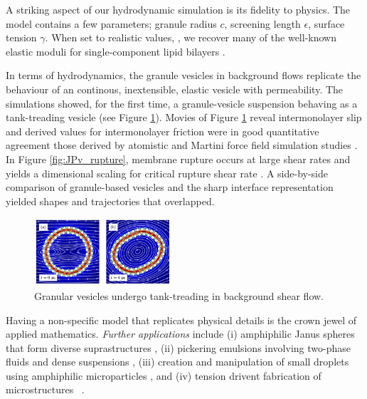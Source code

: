 A striking aspect of our hydrodynamic
simulation is its fidelity to physics.
The model contains a few
parameters; granule radius $c$,
screening length $\epsilon$,
surface tension $\gamma$.
When set to realistic values,
\cite{Fu2018_SIAM, ErLjCl89, Lin2005, Parsegian, Israelachvili80, GarciaSaez, KUZMIN2005, Petelska2012,Jackson2016},
we recover many of the well-known
elastic moduli for single-component lipid bilayers
\cite{Nagle17, Nagle17-2, LeVeWa14,NAGLE2000159}.

In terms of hydrodynamics, the granule vesicles in
background flows replicate
the behaviour of an continous, inextensible,
elastic vesicle with permeability.
The simulations showed, for the first time,
a granule-vesicle suspension behaving
as a tank-treading vesicle \cite{Finken2008, Shaqfeh11}
(see Figure \ref{fig:JPv_linearshear}).
Movies of Figure \ref{fig:JPv_linearshear} reveal
intermonolayer slip and derived values for intermonolayer
friction were in good quantitative agreement 
those derived by atomistic and Martini force field
simulation studies \cite{WuoEd06, denOtter2007, SHKULIPA2005823, Zgorski2019}.
In Figure \ref{fig:JPv_rupture},
membrane rupture occurs at large shear rates 
and yields a dimensional scaling for 
critical rupture shear rate 
\cite{VLAHOVSKA2009775,keller_skalak_1982}.
A side-by-side comparison
of granule-based vesicles and the sharp interface
representation yielded shapes and trajectories that
overlapped.

\begin{figure}
\includegraphics[width=0.46\textwidth]{figures/PreliminaryWork/TankTreading.jpg}
\caption{\label{fig:JPv_linearshear}Granular vesicles undergo
tank-treading in background shear flow.}
\end{figure}
Having a non-specific model that replicates physical details
is the crown jewel of applied mathematics.
\emph{Further applications} include
(i) amphiphilic Janus spheres that form diverse suprastructures
\cite{HaBr20,McBr21,Bradley2017},
(ii) pickering emulsions involving
two-phase fluids and dense suspensions \cite{Bradley2016},
(iii) creation and manipulation of small droplets
using amphiphilic microparticles \cite{Ha2022SurfaceEM,Ha2020MinimalSC},
and (iv) tension drivent fabrication of microstructures
~\cite{Dasgupta2017, Leong2007, Reynolds2019, Cho2010,Zeng20223DprintedMT,Russell2016EnergyLF}.
\newline

